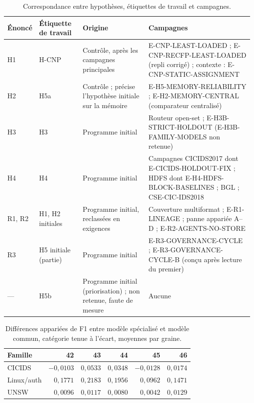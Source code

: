 \begin{table}[H]
\centering
\caption{Correspondance entre hypothèses, étiquettes de travail et campagnes.}
\label{tab:correspondance-hypotheses}
\small
\begin{tabularx}{\textwidth}{p{} p{} p{} X}
\toprule
\textbf{Énoncé} & \textbf{Étiquette de travail} & \textbf{Origine} & \textbf{Campagnes} \\
\midrule
H1 & H-CNP & Contrôle, après les campagnes principales & E-CNP-LEAST-LOADED ; E-CNP-RECFP-LEAST-LOADED (repli corrigé) ; contexte : E-CNP-STATIC-ASSIGNMENT \\
H2 & H5a & Contrôle ; précise l'hypothèse initiale sur la mémoire & E-H5-MEMORY-RELIABILITY ; E-H2-MEMORY-CENTRAL (comparateur centralisé) \\
H3 & H3 & Programme initial & Routeur open-set ; E-H3B-STRICT-HOLDOUT (E-H3B-FAMILY-MODELS non retenue) \\
H4 & H4 & Programme initial & Campagnes CICIDS2017 dont E-CICIDS-HOLDOUT-FIX ; HDFS dont E-H4-HDFS-BLOCK-BASELINES ; BGL ; CSE-CIC-IDS2018 \\
R1, R2 & H1, H2 initiales & Programme initial, reclassées en exigences & Couverture multiformat ; E-R1-LINEAGE ; panne appariée A--D ; E-R2-AGENTS-NO-STORE \\
R3 & H5 initiale (partie) & Programme initial & E-R3-GOVERNANCE-CYCLE ; E-R3-GOVERNANCE-CYCLE-B (conçu après lecture du premier) \\
--- & H5b & Programme initial (priorisation) ; non retenue, faute de mesure & Aucune \\
\bottomrule
\end{tabularx}
\end{table}

\begin{table}[H]
\centering
\small
\caption{Différences appariées de F1 entre modèle spécialisé et modèle commun, catégorie tenue à l'écart, moyennes par graine.}
\label{tab:e-h3b-seed-deltas}
\begin{tabularx}{\textwidth}{Xrrrrr}
\toprule
\textbf{Famille} & \textbf{42} & \textbf{43} & \textbf{44} & \textbf{45} & \textbf{46} \\
\midrule
CICIDS & $-0{,}0103$ & $0{,}0533$ & $0{,}0348$ & $-0{,}0128$ & $0{,}0174$ \\
Linux/auth & $0{,}1771$ & $0{,}2183$ & $0{,}1956$ & $0{,}0962$ & $0{,}1471$ \\
UNSW & $0{,}0096$ & $0{,}0117$ & $0{,}0080$ & $0{,}0042$ & $0{,}0129$ \\
\bottomrule
\end{tabularx}
\end{table}

